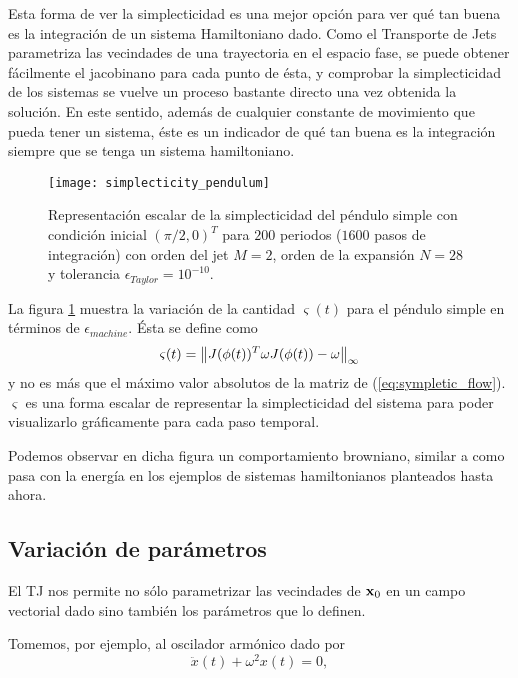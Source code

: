 Esta forma de ver la simplecticidad es una mejor opción para ver qué tan buena es la integración de un sistema Hamiltoniano dado. Como el Transporte de Jets parametriza las vecindades de una trayectoria en el espacio fase, se puede obtener fácilmente el jacobinano para cada punto de ésta, y comprobar la simplecticidad de los sistemas se vuelve un proceso bastante directo una vez obtenida la solución. En este sentido, además de cualquier constante de movimiento que pueda tener un sistema, éste es un indicador de qué tan buena es la integración siempre que se tenga un sistema hamiltoniano.

\begin{figure}[h!]
 \centering
 \texttt{[image: simplecticity\_pendulum]}
 \caption{Representación escalar de la simplecticidad del péndulo simple con condición inicial $( \pi/2,0)^T$ para $200$ periodos ($1600 $ pasos de integración) con orden del jet $M=2$, orden de la expansión $N = 28$ y tolerancia $\epsilon_{Taylor} = 10^{-10}$.}
 \label{fig:simplecticity_pendulum}
\end{figure}

La figura \ref{fig:simplecticity_pendulum} muestra la variación de la cantidad $\varsigma(t)$ para el péndulo simple en términos de $\epsilon_{machine}$. Ésta se define como
\begin{equation}
 \varsigma(t) = \left\lVert J(\phi(t))^T \omega J(\phi(t)) - \omega \right\rVert_\infty
 \label{eq:scalar_symplecticity}
\end{equation}
y no es más que el máximo valor absolutos de la matriz de (\ref{eq:sympletic_flow}). $\varsigma$ es una forma escalar de representar la simplecticidad del sistema para poder visualizarlo gráficamente para cada paso temporal.
  
Podemos observar en dicha figura un comportamiento browniano, similar a como pasa con la energía en los ejemplos de sistemas hamiltonianos planteados hasta ahora.


\subsection{Variación de parámetros}
\label{sec:parameter_variation}
El TJ nos permite no sólo parametrizar las vecindades de $\mathbf{x}_0$ en un campo vectorial dado sino también los parámetros que lo definen.

Tomemos, por ejemplo, al oscilador armónico dado por  
\begin{equation}
 \ddot{x}(t) + \omega^2 x(t) = 0,
 \label{eq:one_dim_oscil}
\end{equation}

